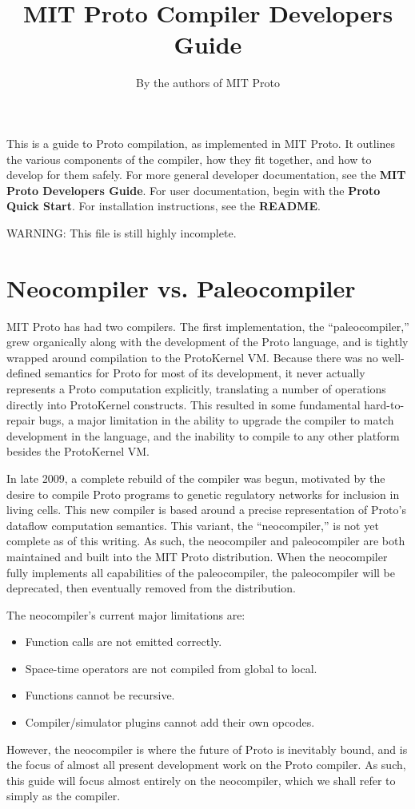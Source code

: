 \documentclass{article}
\title{MIT Proto Compiler Developers Guide}
\author{By the authors of MIT Proto}
\date{\releasetag}
\begin{document}
\maketitle

This is a guide to Proto compilation, as implemented in MIT Proto. It outlines
the various components of the compiler, how they fit together, and how to
develop for them safely.  For more general developer documentation, see the {\bf
MIT Proto Developers Guide}.  For user documentation, begin with the {\bf Proto
Quick Start}. For installation instructions, see the {\bf README}.

WARNING: This file is still highly incomplete.

\tableofcontents

\credits{}

\section{Neocompiler vs. Paleocompiler}

MIT Proto has had two compilers.  The first implementation, the
``paleocompiler,'' grew organically along with the development of the Proto
language, and is tightly wrapped around compilation to the ProtoKernel VM.
Because there was no well-defined semantics for Proto for most of its
development, it never actually represents a Proto computation explicitly,
translating a number of operations directly into ProtoKernel constructs.  This
resulted in some fundamental hard-to-repair bugs, a major limitation in the
ability to upgrade the compiler to match development in the language, and the
inability to compile to any other platform besides the ProtoKernel VM.

In late 2009, a complete rebuild of the compiler was begun, motivated by the
desire to compile Proto programs to genetic regulatory networks for inclusion in
living cells.  This new compiler is based around a precise representation of
Proto's dataflow computation semantics. This variant, the ``neocompiler,'' is
not yet complete as of this writing.  As such, the neocompiler and paleocompiler
are both maintained and built into the MIT Proto distribution.  When the
neocompiler fully implements all capabilities of the paleocompiler, the
paleocompiler will be deprecated, then eventually removed from the distribution.

The neocompiler's current major limitations are:
\begin{itemize}
  \item Function calls are not emitted correctly.
  \item Space-time operators are not compiled from global to local.
  \item Functions cannot be recursive.
  \item Compiler/simulator plugins cannot add their own opcodes.
\end{itemize}
However, the neocompiler is where the future of Proto is inevitably bound, and
is the focus of almost all present development work on the Proto compiler.  As
such, this guide will focus almost entirely on the neocompiler, which we shall
refer to simply as the compiler.
\end{document}

